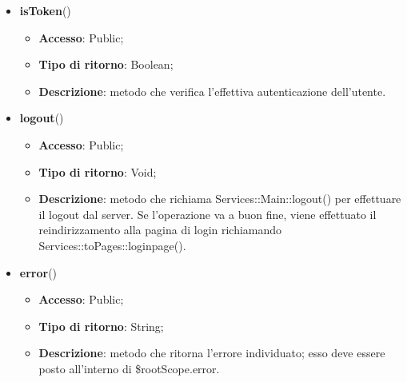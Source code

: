 {\begin{itemize}
		\item \textbf{isToken}()
		\begin{itemize}
			\item \textbf{Accesso}: Public;
			\item \textbf{Tipo di ritorno}: Boolean;
			\item \textbf{Descrizione}: metodo che verifica l'effettiva autenticazione dell'utente.
		\end{itemize}
		\item \textbf{logout}()
		\begin{itemize}
			\item \textbf{Accesso}: Public;
			\item \textbf{Tipo di ritorno}: Void;
			\item \textbf{Descrizione}: metodo che richiama Services::\-Main::\-logout() per effettuare il logout dal server. Se l'operazione va a buon fine, viene effettuato il reindirizzamento alla pagina di login richiamando Services::\-toPages::\-loginpage().
		\end{itemize}
		\item \textbf{error}()
		\begin{itemize}
			\item \textbf{Accesso}: Public;
			\item \textbf{Tipo di ritorno}: String;
			\item \textbf{Descrizione}: metodo che ritorna l'errore individuato; esso deve essere posto all'interno di \$rootScope.error.
		\end{itemize}
	\end{itemize}

}
